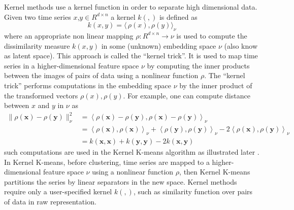 \documentclass[11pt]{article}
\begin{document}
    Kernel methods use a kernel function in order to separate high
dimensional data. Given two time series \(x\),\(y \in R^{d \times n }\)
a kernel \(k(,)\) is defined as \begin{equation}
\label{eq:4}
k(x,y)=  \langle\,\rho (x) ,\rho (y) \rangle_{\nu}
\end{equation} where an appropriate non linear mapping
\(\rho: R^{d \times n } \rightarrow \nu\) is used to compute the
dissimilarity measure \(k(x,y)\) in some (unknown) embedding space
\(\nu\) (also know as latent space). This approach is called the
``kernel trick''. It is used to map time series in a higher-dimensional
feature space \(\nu\) by computing the inner products between the images
of pairs of data using a nonlinear function \(\rho\). The ``kernel
trick'' performs computations in the embedding space \(\nu\) by the
inner product of the transformed vectors \(\rho (x) ,\rho (y)\). For
example, one can compute distance between \(x\) and \(y\) in \(\nu\) as
\begin{equation}
\label{eq:5}
\begin{split}\| \rho(\mathbf{x}) - \rho(\mathbf{y})\|_\mathcal{\nu}^2
    &= \left\langle \rho(\mathbf{x}) - \rho(\mathbf{y}),
                    \rho(\mathbf{x}) - \rho(\mathbf{y})
       \right\rangle_{\mathcal{\nu}} \\
    &= \left\langle \rho(\mathbf{x}), \rho(\mathbf{x})
       \right\rangle_{\mathcal{\nu}}  +
       \left\langle \rho(\mathbf{y}), \rho(\mathbf{y})
       \right\rangle_{\mathcal{\nu}}  - 2
       \left\langle \rho(\mathbf{x}), \rho(\mathbf{y})
       \right\rangle_{\mathcal{\nu}} \\
    &= k(\mathbf{x}, \mathbf{x}) + k(\mathbf{y}, \mathbf{y})
       - 2 k(\mathbf{x}, \mathbf{y})\end{split}
\end{equation} such computations are used in the Kernel K-means
algorithm as illustrated later \cite{dhillon2004kernel} . In Kernel
K-means, before clustering, time series are mapped to a
higher-dimensional feature space \(\nu\) using a nonlinear function
\(\rho\), then Kernel K-means partitions the series by linear separators
in the new space. Kernel methods require only a user-specified kernel
\(k(,)\), such as similarity function over pairs of data in raw
representation.
\end{document}
